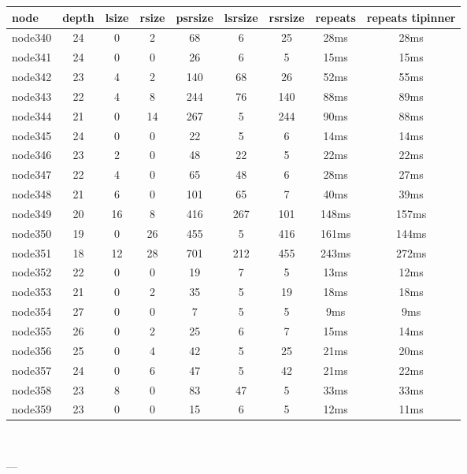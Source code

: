 \begin{tabular}{|l|c|c|c|c|c|c|c|c|}
\hline node & depth & lsize & rsize & psrsize & lsrsize & rsrsize   & repeats & repeats tipinner\\
    \hline node340 & 24 & 0 & 2 & 68 & 6 & 25 & 28ms & 28ms\\
    \hline node341 & 24 & 0 & 0 & 26 & 6 & 5 & 15ms & 15ms\\
    \hline node342 & 23 & 4 & 2 & 140 & 68 & 26 & 52ms & 55ms\\
    \hline node343 & 22 & 4 & 8 & 244 & 76 & 140 & 88ms & 89ms\\
    \hline node344 & 21 & 0 & 14 & 267 & 5 & 244 & 90ms & 88ms\\
    \hline node345 & 24 & 0 & 0 & 22 & 5 & 6 & 14ms & 14ms\\
    \hline node346 & 23 & 2 & 0 & 48 & 22 & 5 & 22ms & 22ms\\
    \hline node347 & 22 & 4 & 0 & 65 & 48 & 6 & 28ms & 27ms\\
    \hline node348 & 21 & 6 & 0 & 101 & 65 & 7 & 40ms & 39ms\\
    \hline node349 & 20 & 16 & 8 & 416 & 267 & 101 & 148ms & 157ms\\
    \hline node350 & 19 & 0 & 26 & 455 & 5 & 416 & 161ms & 144ms\\
    \hline node351 & 18 & 12 & 28 & 701 & 212 & 455 & 243ms & 272ms\\
    \hline node352 & 22 & 0 & 0 & 19 & 7 & 5 & 13ms & 12ms\\
    \hline node353 & 21 & 0 & 2 & 35 & 5 & 19 & 18ms & 18ms\\
    \hline node354 & 27 & 0 & 0 & 7 & 5 & 5 & 9ms & 9ms\\
    \hline node355 & 26 & 0 & 2 & 25 & 6 & 7 & 15ms & 14ms\\
    \hline node356 & 25 & 0 & 4 & 42 & 5 & 25 & 21ms & 20ms\\
    \hline node357 & 24 & 0 & 6 & 47 & 5 & 42 & 21ms & 22ms\\
    \hline node358 & 23 & 8 & 0 & 83 & 47 & 5 & 33ms & 33ms\\
    \hline node359 & 23 & 0 & 0 & 15 & 6 & 5 & 12ms & 11ms\\

\hline
\end{tabular} \

---


